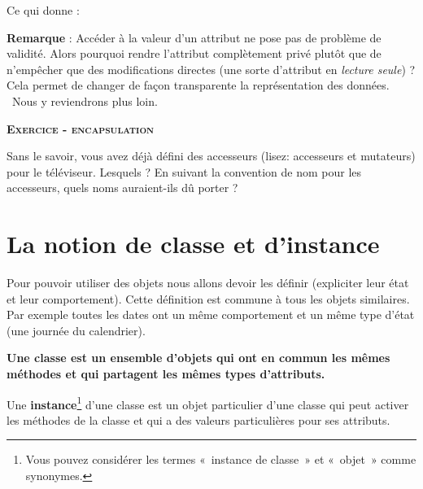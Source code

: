 
\bigskip

Ce qui donne :


\textbf{Remarque} : Accéder à la valeur d’un attribut ne pose pas de
problème de validité. Alors pourquoi rendre l’attribut complètement
privé plutôt que de n’empêcher que des modifications directes (une
sorte d’attribut en \textit{lecture seule}) ? Cela permet de changer de
façon transparente la représentation des données. \ Nous y reviendrons
plus loin.

{\sffamily\bfseries\scshape
Exercice - encapsulation}

Sans le savoir, vous avez déjà défini des accesseurs (lisez: accesseurs
et mutateurs) pour le téléviseur. Lesquels ? En suivant la convention
de nom pour les accesseurs, quels noms auraient-ils dû porter ?


\section{La notion de classe et d'instance}

Pour pouvoir utiliser des objets nous allons devoir les définir
(expliciter leur état et leur comportement). Cette définition est
commune à tous les objets similaires. Par exemple toutes les dates ont
un même comportement et un même type d'état (une
journée du calendrier).

{\sffamily\bfseries\upshape
{
Une \textbf{classe} est un ensemble d'objets qui ont en
commun les mêmes méthodes et qui partagent les mêmes types
d'attributs.}}

Une \textbf{instance}\footnote{Vous pouvez considérer les termes
«~instance de classe~» et «~objet~» comme synonymes. }
d'une classe est un objet particulier
d'une classe qui peut activer les méthodes de la
classe et qui a des valeurs particulières pour ses attributs.

